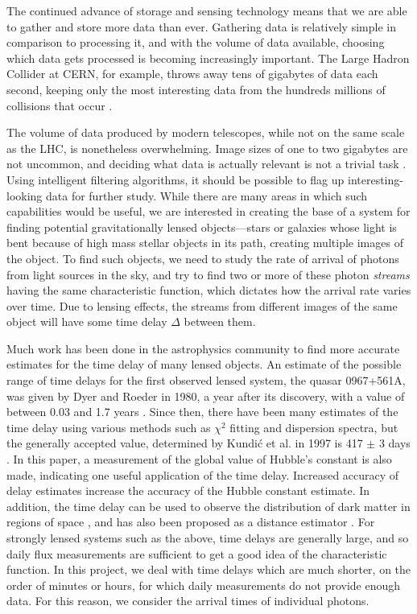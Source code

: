 \documentclass[a4paper,11pt]{article}
\begin{document}
  The continued advance of storage and sensing technology means that we are able
  to gather and store more data than ever. Gathering data is relatively simple
  in comparison to processing it, and with the volume of data available,
  choosing which data gets processed is becoming increasingly important. The
  Large Hadron Collider at CERN, for example, throws away tens of gigabytes of
  data each second, keeping only the most interesting data from the hundreds
  millions of collisions that occur \cite{WLCGproc}.

  The volume of data produced by modern telescopes, while not on the same scale
  as the LHC, is nonetheless overwhelming. Image sizes of one to two gigabytes
  are not uncommon, and deciding what data is actually relevant is not a trivial
  task \cite{starck2002handbook}. Using intelligent filtering algorithms, it
  should be possible to flag up interesting-looking data for further
  study. While there are many areas in which such capabilities would be useful,
  we are interested in creating the base of a system for finding potential
  gravitationally lensed objects---stars or galaxies whose light is bent because
  of high mass stellar objects in its path, creating multiple images of the
  object. To find such objects, we need to study the rate of arrival of photons
  from light sources in the sky, and try to find two or more of these photon
  \emph{streams} having the same characteristic function, which dictates how the
  arrival rate varies over time. Due to lensing effects, the streams from
  different images of the same object will have some time delay $\Delta$ between
  them. 
  
  Much work has been done in the astrophysics community to find more accurate
  estimates for the time delay of many lensed objects. An estimate of the
  possible range of time delays for the first observed lensed system, the quasar
  0967+561A, was given by Dyer and Roeder in 1980, a year after its discovery,
  with a value of between 0.03 and 1.7 years \cite{dyer1980range}. Since then,
  there have been many estimates of the time delay using various methods such as
  $\chi$$^2$ fitting and dispersion spectra, but the generally accepted value,
  determined by Kundi\'c et al. in 1997 is 417 $\pm$ 3 days
  \cite{kundic1997robust}. In this paper, a measurement of the global value of
  Hubble's constant is also made, indicating one useful application of the time
  delay. Increased accuracy of delay estimates increase the accuracy of the
  Hubble constant estimate. In addition, the time delay can be used to observe
  the distribution of dark matter in regions of space
  \cite{schneider2006gravitational}, and has also been proposed as a distance
  estimator \cite{bozza2004time}. For strongly lensed systems such as the above,
  time delays are generally large, and so daily flux measurements are sufficient
  to get a good idea of the characteristic function. In this project, we deal
  with time delays which are much shorter, on the order of minutes or hours, for
  which daily measurements do not provide enough data. For this reason, we
  consider the arrival times of individual photons.
\end{document}
